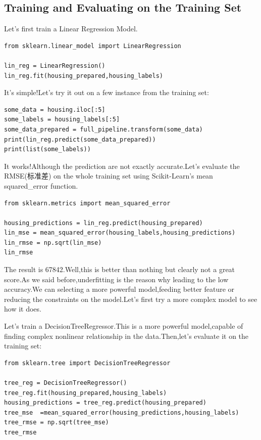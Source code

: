 \documentclass[UTF8]{ctexart}
\begin{document}
\subsection{Training and Evaluating on the Training Set}

Let's first train a Linear Regression Model.
\begin{lstlisting}
from sklearn.linear_model import LinearRegression

lin_reg = LinearRegression()
lin_reg.fit(housing_prepared,housing_labels)
\end{lstlisting}

It's simple!Let's try it out on a few instance from the training set:

\begin{lstlisting}
some_data = housing.iloc[:5]
some_labels = housing_labels[:5]
some_data_prepared = full_pipeline.transform(some_data)
print(lin_reg.predict(some_data_prepared))
print(list(some_labels))
\end{lstlisting}

It works!Although the prediction are not exactly accurate.Let's evaluate the RMSE(标准差) on the whole training set using Scikit-Learn's mean\underline{ }squared\_error function.

\begin{lstlisting}
from sklearn.metrics import mean_squared_error

housing_predictions = lin_reg.predict(housing_prepared)
lin_mse = mean_squared_error(housing_labels,housing_predictions)
lin_rmse = np.sqrt(lin_mse)
lin_rmse
\end{lstlisting}

The result is 67842.Well,this is better than nothing but clearly not a great score.As we said before,underfitting is the reason why leading to the low accuracy.We can selecting a more powerful model,feeding better feature or reducing the constraints on the model.Let's first try a more complex model to see how it does.

Let's train a DecisionTreeRegressor.This is a more powerful model,capable of finding complex nonlinear relationship in the data.Then,let's evaluate it on the training set:

\begin{lstlisting}
from sklearn.tree import DecisionTreeRegressor

tree_reg = DecisionTreeRegressor()
tree_reg.fit(housing_prepared,housing_labels)
housing_predictions = tree_reg.predict(housing_prepared)
tree_mse  =mean_squared_error(housing_predictions,housing_labels)
tree_rmse = np.sqrt(tree_mse)
tree_rmse
\end{lstlisting}
\end{document}
